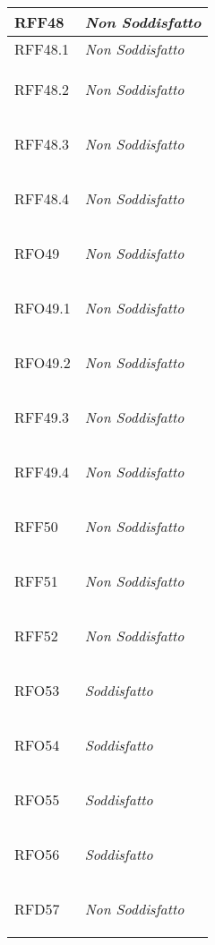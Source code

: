 \begin{longtable}{|>{\centering}m{5cm}|m{5cm}<{\centering}|}
    \hypertarget{RFF48}{RFF48} & \textit{Non Soddisfatto}\\ \hline
   
    \hypertarget{RFF48.1}{RFF48.1} & \textit{Non Soddisfatto}\\ \hline
   
    \hypertarget{RFF48.2}{RFF48.2} & \textit{Non Soddisfatto}\\ \hline
   
    \hypertarget{RFF48.3}{RFF48.3} & \textit{Non Soddisfatto}\\ \hline
   
    \hypertarget{RFF48.4}{RFF48.4} & \textit{Non Soddisfatto}\\ \hline
   
    \hypertarget{RFO49}{RFO49} & \textit{Non Soddisfatto}\\ \hline
   
    \hypertarget{RFO49.1}{RFO49.1} & \textit{Non Soddisfatto}\\ \hline
   
    \hypertarget{RFO49.2}{RFO49.2} & \textit{Non Soddisfatto}\\ \hline
   
    \hypertarget{RFF49.3}{RFF49.3} & \textit{Non Soddisfatto}\\ \hline
   
    \hypertarget{RFF49.4}{RFF49.4} & \textit{Non Soddisfatto}\\ \hline
   
    \hypertarget{RFF50}{RFF50} & \textit{Non Soddisfatto}\\ \hline
   
    \hypertarget{RFF51}{RFF51} & \textit{Non Soddisfatto}\\ \hline
   
    \hypertarget{RFF52}{RFF52} & \textit{Non Soddisfatto}\\ \hline
   
    \hypertarget{RFO53}{RFO53} & \textit{Soddisfatto}\\ \hline
   
    \hypertarget{RFO54}{RFO54} & \textit{Soddisfatto}\\ \hline
   
    \hypertarget{RFO55}{RFO55} & \textit{Soddisfatto}\\ \hline
   
    \hypertarget{RFO56}{RFO56} & \textit{Soddisfatto}\\ \hline
   
    \hypertarget{RFD57}{RFD57} & \textit{Non Soddisfatto}\\ \hline
   

\end{longtable}
